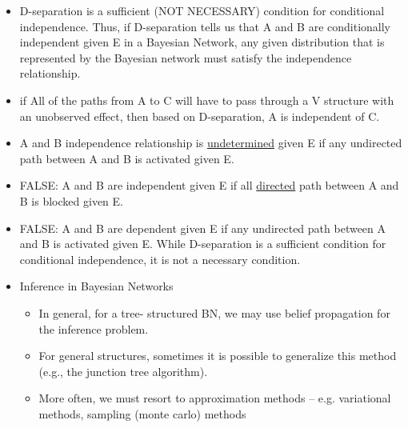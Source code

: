 \documentclass[10pt]{article}
\begin{document}
\begin{itemize}[label=\(\star\), leftmargin=1em, itemsep=-0.3em]
\begin{itemize}[label=\(\star\), leftmargin=1em, itemsep=-0.2em]
          \end{itemize}
    \item D-separation is a  sufficient (NOT NECESSARY) condition for conditional independence. Thus, if D-separation tells us that A and B are conditionally independent given E in a Bayesian Network, any given distribution that is represented by the Bayesian network must satisfy the independence relationship.
    \item if All of the paths from A to C will have to pass through a V structure with an unobserved effect, then based on D-separation, A is independent of C.
    \item A and B independence relationship is \underline{undetermined} given E if any undirected path between A and B is activated given E.
    \item FALSE: A and B are independent given E if all \underline{directed} path between A and B is blocked given E.
    \item FALSE: A and B are dependent given E if any undirected path between A and B is activated given E. While D-separation is a sufficient condition for conditional independence, it is not a necessary condition.
    \item Inference in Bayesian Networks

          \begin{itemize}[label=\(\star\), leftmargin=1em, itemsep=-0.2em]
              \item In general, for a tree- structured BN, we may use belief propagation for the inference problem.
              \item For general structures, sometimes it is possible to generalize this method (e.g., the junction tree algorithm).
              \item More often, we must resort to approximation methods -- e.g. variational methods, sampling (monte carlo) methods

          \end{itemize}



\end{itemize}
\end{document}
